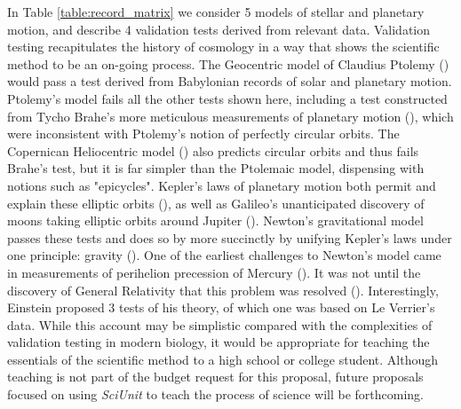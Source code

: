 \documentclass[11pt,letterpaper]{article}
\begin{document}
In Table \ref{table:record_matrix} we consider 5 models of stellar and planetary motion, and describe 4 validation tests derived from relevant data.  Validation testing recapitulates the history of cosmology in a way that shows the scientific method to be an on-going process.  The Geocentric model of Claudius Ptolemy (\cite{ptolemy_almagest_150}) would pass a test derived from Babylonian records of solar and planetary motion.  Ptolemy's model fails all the other tests shown here, including a test constructed from Tycho Brahe's more meticulous measurements of planetary motion (\cite{kepler_rudolphine_1627}), which were inconsistent with Ptolemy's notion of perfectly circular orbits.  The Copernican Heliocentric model (\cite{copernicus_revolutionibus_1543}) also predicts circular orbits and thus fails Brahe's test, but it is far simpler than the Ptolemaic model, dispensing with notions such as "epicycles".  Kepler's laws of planetary motion both permit and explain these elliptic orbits (\cite{kepler_astronomia_1609}), as well as Galileo's unanticipated discovery of moons taking elliptic orbits around Jupiter (\cite{galilei_siderius_1610}).  Newton's gravitational model passes these tests and does so by more succinctly by unifying Kepler's laws under one principle: gravity (\cite{newton_philosophiae_1687}).  One of the earliest challenges to Newton's model came in measurements of perihelion precession of Mercury (\cite{le_verrier_lettre_1859}).  It was not until the discovery of General Relativity that this problem was resolved (\cite{einstein_foundation_1916}).  Interestingly, Einstein proposed 3 tests of his theory, of which one was based on Le Verrier's data.  While this account may be simplistic compared with the complexities of validation testing in modern biology, it would be appropriate for teaching the essentials of the scientific method to a high school or college student.  Although teaching is not part of the budget request for this proposal, future proposals focused on using \textit{SciUnit} to teach the process of science will be forthcoming.  
\end{document}
